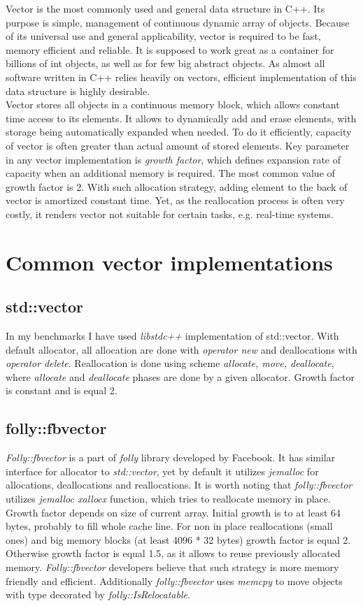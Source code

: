 \documentclass[inz, english, shortabstract]{iithesis}
\begin{document}
Vector is the most commonly used and general data structure in C++. Its purpose is simple, management of continuous dynamic array of objects. Because of its universal use and general applicability, vector is required to be fast, memory efficient and reliable. It is supposed to work great as a container for billions of int objects, as well as for few big abstract objects. As almost all software written in C++ relies heavily on vectors, efficient implementation of this data structure is highly desirable.
\\
Vector stores all objects in a continuous memory block, which allows constant time access to its elements. It allows to dynamically add and erase elements, with storage being automatically expanded when needed. To do it efficiently, capacity of vector is often greater than actual amount of stored elements. Key parameter in any vector implementation is {\it growth factor}, which defines expansion rate of capacity when an additional memory is required. The most common value of growth factor is 2. With such allocation strategy, adding element to the back of vector is amortized constant time. Yet, as the reallocation process is often very costly, it renders vector not suitable for certain tasks, e.g. real-time systems. 

\chapter{Common vector implementations}
\section{std::vector}
In my benchmarks I have used {\it libstdc++} implementation\cite{std::vector_impl} of std::vector. With default allocator, all allocation are done with {\it operator new} and deallocations with {\it operator delete}. Reallocation is done using scheme {\it allocate, move, deallocate}, where {\it allocate} and {\it  deallocate} phases are done by a given allocator. Growth factor is constant and is equal 2.

\section{folly::fbvector}
{\it Folly::fbvector}\cite{folly::fbvector_impl} is a part of {\it folly} library developed by Facebook. It has similar interface for allocator to {\it std::vector}, yet by default it utilizes {\it jemalloc} for allocations, deallocations and reallocations\cite{folly::fbvector_description}. It is worth noting that {\it folly::fbvector} utilizes {\it jemalloc xallocx} function, which tries to reallocate memory in place. Growth factor depends on size of current array. Initial growth is to at least 64 bytes, probably to fill whole cache line. For non in place reallocations (small ones) and big memory blocks (at least 4096 * 32 bytes) growth factor is equal 2. Otherwise growth factor is equal 1.5, as it allows to reuse previously allocated memory. {\it Folly::fbvector} developers believe that such strategy is more memory friendly and efficient\cite{folly::fbvector_description}. Additionally {\it folly::fbvector} uses {\it memcpy} to move objects with type decorated by {\it folly::IsRelocatable}.
\end{document}
